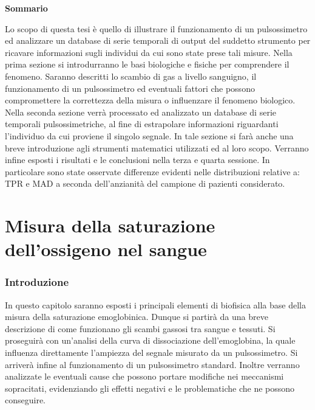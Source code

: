 \documentclass[12pt,a4paper, twoside, openright]{report}
\begin{document}
\thispagestyle{empty}
\cleardoublepage


\vspace*{\fill}
\begingroup
\begin{center}
\large\textbf{Sommario}
\end{center}
Lo scopo di questa tesi è quello di illustrare il funzionamento di un pulsossimetro ed analizzare un database di serie temporali di output del suddetto strumento per ricavare informazioni sugli individui da cui sono state prese tali misure.
Nella prima sezione si introdurranno le basi biologiche e fisiche per comprendere il fenomeno.
Saranno descritti lo scambio di gas a livello sanguigno, il funzionamento di un pulsossimetro ed eventuali fattori che possono compromettere la correttezza della misura o influenzare il fenomeno biologico.
Nella seconda sezione verrà processato ed analizzato un database di serie temporali pulsossimetriche, al fine di estrapolare informazioni riguardanti l'individuo da cui proviene il singolo segnale.
In tale sezione si farà anche una breve introduzione agli strumenti matematici utilizzati ed al loro scopo.
Verranno infine esposti i risultati e le conclusioni nella terza e quarta sessione.
In particolare sono state osservate differenze evidenti nelle distribuzioni relative a: TPR e MAD a seconda dell'anzianità del campione di pazienti considerato.
\endgroup
\vspace*{\fill}
\thispagestyle{empty}
\newpage
\thispagestyle{empty}



\tableofcontents

\thispagestyle{empty}
\newpage
\thispagestyle{empty}


\chapter{Misura della saturazione dell'ossigeno nel sangue}


\subsection{Introduzione}

In questo capitolo saranno esposti i principali elementi di biofisica alla base della misura della saturazione emoglobinica. 
Dunque si partirà da una breve descrizione di come funzionano gli scambi gassosi tra sangue e tessuti. 
Si proseguirà con un'analisi della curva di dissociazione dell'emoglobina, la quale influenza direttamente l'ampiezza del segnale misurato da un pulsossimetro. 
Si arriverà infine al funzionamento di un pulsossimetro standard. 
Inoltre verranno analizzate le eventuali cause che possono portare modifiche nei meccanismi sopracitati, evidenziando gli effetti negativi e le problematiche che ne possono conseguire.
\end{document}
